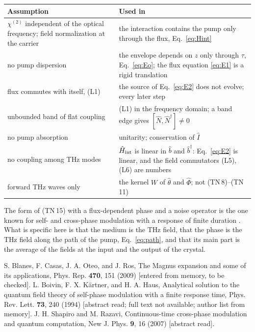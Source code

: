 \documentclass[aps,pra,onecolumn,notitlepage,11pt,amsmath,amssymb,nofootinbib]{revtex4-2}
\newcommand{\Nop}{\hat N}
\newcommand{\Iop}{\hat I}
\begin{document}
\begin{center}
\begin{tabular}{R{0.36\textwidth}R{0.57\textwidth}}
\hline\hline
Assumption & Used in\\
\hline
$\chi^{(2)}$ independent of the optical frequency; field normalization at the carrier & the interaction contains the pump only through the flux, Eq.~\eqref{eq:Hint}\\[4pt]
no pump dispersion & the envelope depends on $z$ only through $\tau$, Eq.~\eqref{eq:Eo}; the flux equation \eqref{eq:E1} is a rigid translation\\[4pt]
flux commutes with itself, (L1) & the source of Eq.~\eqref{eq:E2} does not evolve; every later step\\[4pt]
unbounded band of flat coupling & (L1) in the frequency domain; a band edge gives $[\Nop,\Nop^\dagger]\neq0$\\[4pt]
no pump absorption & unitarity; conservation of $\Iop$\\[4pt]
no coupling among THz modes & $\hat H_{\rm int}$ is linear in $\hat b$ and $\hat b^\dagger$: Eq.~\eqref{eq:E2} is linear, and the field commutators (L5), (L6) are numbers\\[4pt]
forward THz waves only & the kernel $W$ of $\hat\theta$ and $\hat\Phi$; not (TN\,8)--(TN\,11)\\
\hline\hline
\end{tabular}
\end{center}

The form of (TN\,15) with a flux-dependent phase and a noise operator is the
one known for self- and cross-phase modulation with a response of finite
duration \cite{boivin1994,shapirorazavi2007}. What is specific here is that
the medium is the THz field, that the phase is the THz field along the path
of the pump, Eq.~\eqref{eq:path}, and that its main part is the average of
the fields at the input and the output of the crystal.

\begin{thebibliography}{9}
 S. Blanes, F. Casas, J. A. Oteo, and J. Ros, The Magnus
expansion and some of its applications, Phys. Rep. \textbf{470}, 151 (2009)
[entered from memory, to be checked].
 L. Boivin, F. X. K\"artner, and H. A. Haus, Analytical
solution to the quantum field theory of self-phase modulation with a finite
response time, Phys. Rev. Lett. \textbf{73}, 240 (1994) [abstract read; full
text not available; author list from memory].
 J. H. Shapiro and M. Razavi, Continuous-time
cross-phase modulation and quantum computation, New J. Phys. \textbf{9}, 16
(2007) [abstract read].
\end{thebibliography}
\end{document}
